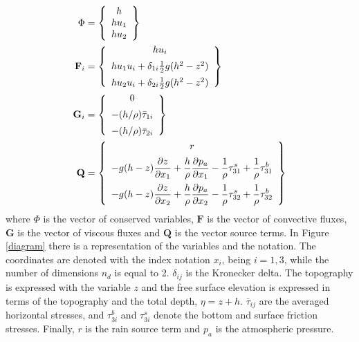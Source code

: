 \documentclass[a4paper,12pt]{article}
\newcommand{\pder}[2]{\frac{\partial#1}{\partial#2}}
\begin{document}
\begin{subequations}\label{variables_and_fluxes}
\allowdisplaybreaks
\begin{align}
\Phi &= \left\{
    \begin{array}{c}
        h \\
        hu_1 \\
        hu_2
    \end{array}\right\} \\
\mathbf{F}_i &= \left\{
    \begin{array}{c}
        hu_i \\ [5pt]
        hu_1u_i + \delta_{1i}\frac{1}{2}g(h^2 - z^2) \\ [5pt]
        hu_2u_i + \delta_{2i}\frac{1}{2}g(h^2 - z^2)
    \end{array}\right\} \\
\mathbf{G}_i &= \left\{
    \begin{array}{c}
        0 \\ [5pt]
        -(h/\rho) \bar{\tau}_{1i} \\ [5pt]
        -(h/\rho) \bar{\tau}_{2i}
    \end{array}\right\} \\
\mathbf{Q} &= \left\{
    \begin{array}{c}
        r \\ [5pt]
        \displaystyle -g(h-z)\pder{z}{x_1} + \frac{h}{\rho}\pder{p_a}{x_1}
        - \frac{1}{\rho}\tau^s_{31} + \frac{1}{\rho}\tau^b_{31} \\ [10pt]
        \displaystyle -g(h-z)\pder{z}{x_2} + \frac{h}{\rho}\pder{p_a}{x_2}
        - \frac{1}{\rho}\tau^s_{32} + \frac{1}{\rho}\tau^b_{32}
    \end{array}\right\}
\end{align}
\end{subequations}
where $\Phi$ is the vector of conserved variables, $\mathbf{F}$ is the vector of convective fluxes, $\mathbf{G}$ is the vector of viscous fluxes and $\mathbf{Q}$ is the vector source terms. In Figure \ref{diagram} there is a representation of the variables and the notation. The coordinates are denoted with the index notation $x_i$, being $i=1,3$, while the number of dimensions $n_d$ is equal to 2. $\delta_{ij}$ is the Kronecker delta. The topography is expressed with the variable $z$ and the free surface elevation is expressed in terms of the topography and the total depth, $\eta = z + h$. $\bar{\tau}_{ij}$ are the averaged horizontal stresses, and $\tau^b_{3i}$ and $\tau^s_{3i}$ denote the bottom and surface friction stresses. Finally, $r$ is the rain source term and $p_a$ is the atmospheric pressure.
\end{document}
